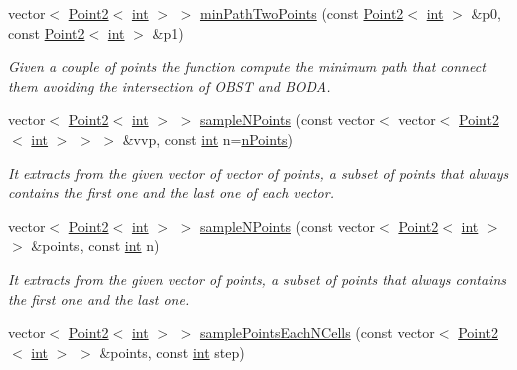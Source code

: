 \begin{DoxyCompactItemize}
vector$<$ \mbox{\hyperlink{class_point2}{Point2}}$<$ \mbox{\hyperlink{draw_8hh_aa620a13339ac3a1177c86edc549fda9b}{int}} $>$ $>$ \mbox{\hyperlink{class_mapp_a5b6a630049118dbfa22604f513db11f1}{min\+Path\+Two\+Points}} (const \mbox{\hyperlink{class_point2}{Point2}}$<$ \mbox{\hyperlink{draw_8hh_aa620a13339ac3a1177c86edc549fda9b}{int}} $>$ \&p0, const \mbox{\hyperlink{class_point2}{Point2}}$<$ \mbox{\hyperlink{draw_8hh_aa620a13339ac3a1177c86edc549fda9b}{int}} $>$ \&p1)
\begin{DoxyCompactList}\small\item\em Given a couple of points the function compute the minimum path that connect them avoiding the intersection of O\+B\+ST and B\+O\+DA. \end{DoxyCompactList}\item 
vector$<$ \mbox{\hyperlink{class_point2}{Point2}}$<$ \mbox{\hyperlink{draw_8hh_aa620a13339ac3a1177c86edc549fda9b}{int}} $>$ $>$ \mbox{\hyperlink{class_mapp_a34bd022816ce083d4bb125119f47f470}{sample\+N\+Points}} (const vector$<$ vector$<$ \mbox{\hyperlink{class_point2}{Point2}}$<$ \mbox{\hyperlink{draw_8hh_aa620a13339ac3a1177c86edc549fda9b}{int}} $>$ $>$ $>$ \&vvp, const \mbox{\hyperlink{draw_8hh_aa620a13339ac3a1177c86edc549fda9b}{int}} n=\mbox{\hyperlink{class_mapp_addd9fcc5e7db2c40038ab32ecf29171c}{n\+Points}})
\begin{DoxyCompactList}\small\item\em It extracts from the given vector of vector of points, a subset of points that always contains the first one and the last one of each vector. \end{DoxyCompactList}\item 
vector$<$ \mbox{\hyperlink{class_point2}{Point2}}$<$ \mbox{\hyperlink{draw_8hh_aa620a13339ac3a1177c86edc549fda9b}{int}} $>$ $>$ \mbox{\hyperlink{class_mapp_aaa8b4ed2cacdfdeb89d2b30b3684a535}{sample\+N\+Points}} (const vector$<$ \mbox{\hyperlink{class_point2}{Point2}}$<$ \mbox{\hyperlink{draw_8hh_aa620a13339ac3a1177c86edc549fda9b}{int}} $>$ $>$ \&points, const \mbox{\hyperlink{draw_8hh_aa620a13339ac3a1177c86edc549fda9b}{int}} n)
\begin{DoxyCompactList}\small\item\em It extracts from the given vector of points, a subset of points that always contains the first one and the last one. \end{DoxyCompactList}\item 
vector$<$ \mbox{\hyperlink{class_point2}{Point2}}$<$ \mbox{\hyperlink{draw_8hh_aa620a13339ac3a1177c86edc549fda9b}{int}} $>$ $>$ \mbox{\hyperlink{class_mapp_a487a24310b4ee3babffc06a60c5893f3}{sample\+Points\+Each\+N\+Cells}} (const vector$<$ \mbox{\hyperlink{class_point2}{Point2}}$<$ \mbox{\hyperlink{draw_8hh_aa620a13339ac3a1177c86edc549fda9b}{int}} $>$ $>$ \&points, const \mbox{\hyperlink{draw_8hh_aa620a13339ac3a1177c86edc549fda9b}{int}} step)

\end{DoxyCompactItemize}
